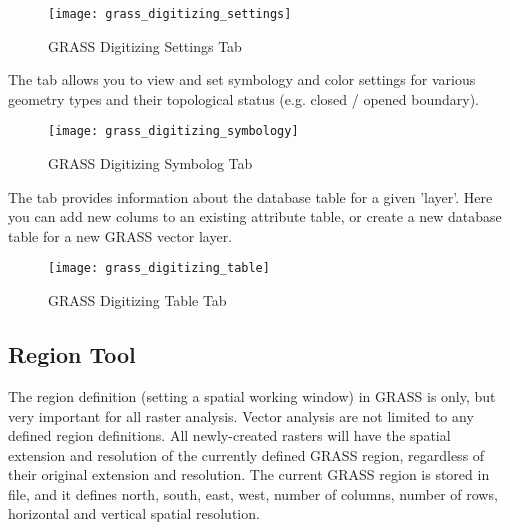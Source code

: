 \begin{figure}[h]
 \begin{center}
 \caption{GRASS Digitizing Settings Tab \nixcaption}\label{fig:grass_digitizing_settings}
 \texttt{[image: grass\_digitizing\_settings]}
 \end{center}
\end{figure}


The  tab allows you to view and set symbology and color
settings for various geometry types and their topological status (e.g. closed
/ opened boundary).

\begin{figure}[h]
 \begin{center}
 \caption{GRASS Digitizing Symbolog Tab \nixcaption}\label{fig:grass_digitizing_symbology}
 \texttt{[image: grass\_digitizing\_symbology]}
 \end{center}
\end{figure}

 

The  tab provides information about the database table for
a given 'layer'. Here you can add new colums to an existing attribute table,
or create a new database table for a new GRASS vector layer.

\begin{figure}[h]
 \begin{center}
 \caption{GRASS Digitizing Table Tab \nixcaption}\label{fig:grass_digitizing_table}
 \texttt{[image: grass\_digitizing\_table]}
 \end{center}
\end{figure}

\begin{Tip}\caption{\textsc{GRASS Edit Permissions}}
\end{Tip} 

\subsection{Region Tool}

The region definition (setting a spatial working window) in GRASS is only,
but very important for all raster analysis. Vector analysis are not limited
to any defined region definitions. All newly-created rasters will have the
spatial extension and resolution of the currently defined GRASS region,
regardless of their original extension and resolution. The current GRASS
region is stored in  file, and it defines
north, south, east, west, number of columns, number of rows, horizontal and
vertical spatial resolution.

